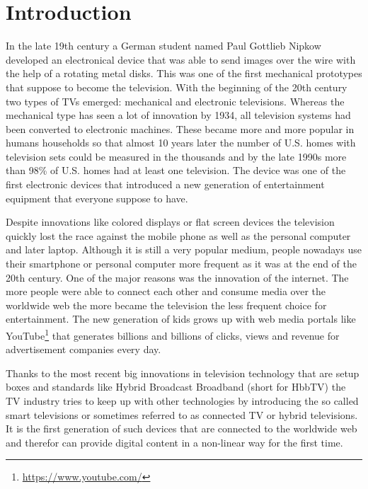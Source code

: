 %

\chapter{Introduction\label{cha:introduction}}

In the late 19th century a German student named Paul Gottlieb Nipkow developed an electronical device
that was able to send images over the wire with the help of a rotating metal disks. This was one of the first
mechanical prototypes that suppose to become the television. With the beginning of the 20th century two types
of TVs emerged: mechanical and electronic televisions. Whereas the mechanical type has seen a lot of
innovation by 1934, all television systems had been converted to electronic machines. These became more and
more popular in humans households so that almost 10 years later the number of U.S. homes with television sets
could be measured in the thousands and by the late 1990s more than 98\% of U.S. homes had at least one
television. The device was one of the first electronic devices that introduced a new generation of entertainment
equipment that everyone suppose to have.

Despite innovations like colored displays or flat screen devices the television quickly lost the race against
the mobile phone as well as the personal computer and later laptop. Although it is still a very popular
medium, people nowadays use their smartphone or personal computer more frequent as it was at the end of the
20th century. One of the major reasons was the innovation of the internet. The more people were able to connect
each other and consume media over the worldwide web the more became the television the less frequent choice for
entertainment. The new generation of kids grows up with web media portals like YouTube\footnote{\url{https://www.youtube.com/}}
that generates billions and billions of clicks, views and revenue for advertisement companies every day.

Thanks to the most recent big innovations in television technology that are setup boxes and standards like
Hybrid Broadcast Broadband (short for HbbTV) the TV industry tries to keep up with other technologies by
introducing the so called smart televisions or sometimes referred to as connected TV or hybrid televisions.
It is the first generation of such devices that are connected to the worldwide web and therefor can provide
digital content in a non-linear way for the first time.

